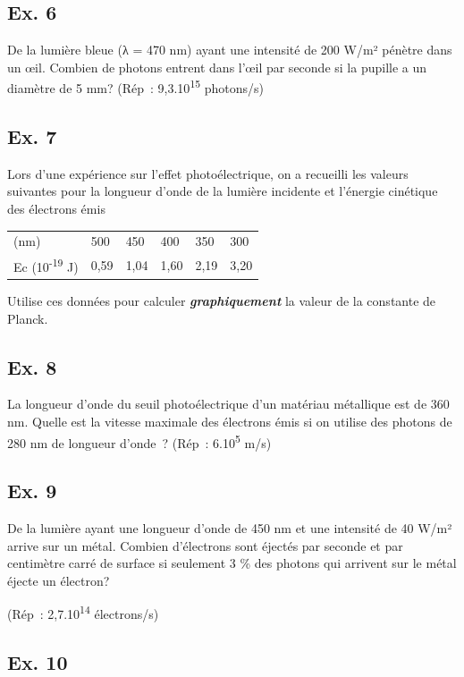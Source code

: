 {\subsection{Ex. 6}

De la lumière bleue (λ = 470 nm) ayant une intensité de 200 W/m² pénètre
dans un œil. Combien de photons entrent dans l'œil par seconde si la
pupille a un diamètre de 5 mm? (Rép~: 9,3.10\textsuperscript{15
}photons/s)

\subsection{Ex. 7}

Lors d'une expérience sur l'effet photoélectrique, on a recueilli les
valeurs suivantes pour la longueur d'onde de la lumière incidente et
l'énergie cinétique des électrons émis

\begin{longtable}[]{@{}llllll@{}}
(nm) & 500 & 450 & 400 & 350 & 300\tabularnewline
Ec (10\textsuperscript{-19} J) & 0,59 & 1,04 & 1,60 & 2,19 &
3,20\tabularnewline
\end{longtable}

Utilise ces données pour calculer \emph{\textbf{graphiquement}} la
valeur de la constante de Planck.

\subsection{Ex. 8}

La longueur d'onde du seuil photoélectrique d'un matériau métallique est
de 360 nm. Quelle est la vitesse maximale des électrons émis si on
utilise des photons de 280 nm de longueur d'onde~? (Rép~:
6.10\textsuperscript{5} m/s)

\subsection{Ex. 9}

De la lumière ayant une longueur d'onde de 450 nm et une intensité de 40
W/m² arrive sur un métal. Combien d'électrons sont éjectés par seconde
et par centimètre carré de surface si seulement 3 \% des photons qui
arrivent sur le métal éjecte un électron?

(Rép~: 2,7.10\textsuperscript{14} électrons/s)

\subsection{Ex. 10}

}
